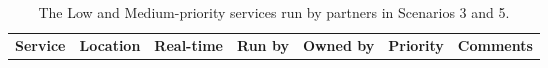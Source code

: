 \begin{table} \centering
{}
\begin{tabular}{p{\mycolwidth} p{\mycolwidth} l l l l p{\mycolwidth}}
{\bf \tiny Service}  & {\bf \tiny Location} & \bf {\tiny Real-time} & {\bf \tiny Run by} & \bf {\tiny Owned by} & {\bf \tiny Priority} & {\bf \tiny Comments} \\

\end{tabular}
\caption{The Low and Medium-priority \einfra services run by partners in Scenarios 3 and 5. \label{tab:services:s3a}}
\end{table}
